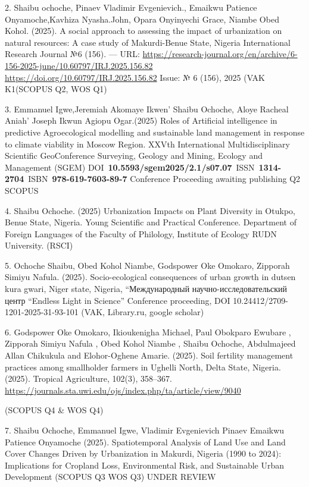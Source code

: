 2. Shaibu ochoche, Pinaev Vladimir Evgenievich., Emaikwu Patience Onyamoche,Kavhiza Nyasha.John, Opara Onyinyechi Grace, Niambe Obed Kohol. (2025). A social approach to assessing the impact of urbanization on natural resources: A case study of Makurdi-Benue State, Nigeria International Research Journal №6 (156). --- URL: \url{https://research-journal.org/en/archive/6-156-2025-june/10.60797/IRJ.2025.156.82} \url{https://doi.org/10.60797/IRJ.2025.156.82} Issue: № 6 (156), 2025 (VAK K1(SCOPUS Q2, WOS Q1)

3. Emmanuel Igwe,Jeremiah Akomaye Ikwen' Shaibu Ochoche, Aloye Racheal Aniah' Joseph Ikwun Agiopu Ogar.(2025) Roles of Artificial intelligence in predictive Agroecological modelling and sustainable land management in response to climate viability in Moscow Region. XXVth International Multidisciplinary Scientific GeoConference Surveying, Geology and Mining, Ecology and Management (SGEM) DOI~\textbf{10.5593/sgem2025/2.1/s07.07}~ISSN~\textbf{1314-2704}~ISBN~\textbf{978-619-7603-89-7} Conference Proceeding awaiting publishing Q2 SCOPUS

4. Shaibu Ochoche. (2025) Urbanization Impacts on Plant Diversity in Otukpo, Benue State, Nigeria. Young Scientific and Practical Conference. Department of Foreign Languages of the Faculty of Philology, Institute of Ecology RUDN University. (RSCI)

5. Ochoche Shaibu, Obed Kohol Niambe, Godspower Oke Omokaro, Zipporah Simiyu Nafula. (2025). Socio-ecological consequences of urban growth in dutsen kura gwari, Niger state, Nigeria, ``Международный научно-исследовательский центр ``Endless Light in Science'' Conference proceeding, DOI 10.24412/2709-1201-2025-31-93-101 (VAK, Library.ru, google scholar)

6. Godspower Oke Omokaro, Ikioukenigha Michael, Paul Obokparo Ewubare , Zipporah Simiyu Nafula , Obed Kohol Niambe , Shaibu Ochoche, Abdulmajeed Allan Chikukula and Elohor-Oghene Amarie. (2025). Soil fertility management practices among smallholder farmers in Ughelli North, Delta State, Nigeria. (2025). Tropical Agriculture, 102(3), 358--367. \url{https://journals.sta.uwi.edu/ojs/index.php/ta/article/view/9040}

(SCOPUS Q4 \& WOS Q4)

7. Shaibu Ochoche, Emmanuel Igwe, Vladimir Evgenievich Pinaev Emaikwu Patience Onyamoche (2025). Spatiotemporal Analysis of Land Use and Land Cover Changes Driven by Urbanization in Makurdi, Nigeria (1990 to 2024): Implications for Cropland Loss, Environmental Risk, and Sustainable Urban Development (SCOPUS Q3 WOS Q3) UNDER REVIEW

